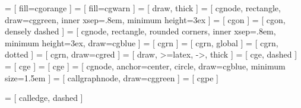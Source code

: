 \newcommand{\thesistitle}{Compiler-Assisted Memory Management Using Escape Analysis in the KESO JVM}
\newcommand{\thesisauthor}{Clemens Lang}
\newcommand{\thesissubject}{Informatik}
\newcommand{\thesisbirthlocation}{Lichtenfels}
\newcommand{\thesisadvisors}{%
	Prof.\ Dr.-Ing.\ habil.\ Wolfgang Schröder-Preikschat\\
	Dipl.-Inf.\ Isabella Stilkerich\\
	Dipl.-Inf.\ Christoph Erhardt
}
\newcommand{\thesiskeywords}{KESO, embedded systems, Jalapenos, Java}





 = [
	fill=cgorange
]
 = [
	fill=cgwarn
]
 = [
	draw,
	thick
]
 = [
	cgnode,
	rectangle,
	draw=cggreen,
	inner xsep=.8em,
	minimum height=3ex
]
 = [
	cgon
]
 = [
	cgon,
	densely dashed
]
 = [
	cgnode,
	rectangle,
	rounded corners,
	inner xsep=.8em,
	minimum height=3ex,
	draw=cgblue
]
 = [
	cgrn
]
 = [
	cgrn,
	global
]
 = [
	cgrn,
	dotted
]
 = [
	cgrn,
	draw=cgred
]
 = [
	draw,
	>=latex,
	->,
	thick
]
 = [
	cge,
	dashed
]
 = [
	cge
]
 = [
	cge
]
 = [
	cgnode,
	anchor=center,
	circle,
	draw=cgblue,
	minimum size=1.5em
]
 = [
	callgraphnode,
	draw=cggreen
]
 = [
	cgpe
]

 = [
	calledge,
	dashed
]






\clearpage{}
\thispagestyle{empty}

\let\realcleardoublepage\cleardoublepage
\let\cleardoublepage\relax
\tableofcontents{}
\let\cleardoublepage\realcleardoublepage


